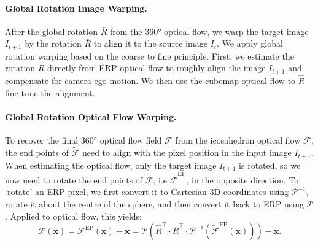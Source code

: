 \vspace{-1em}
\paragraph{Global Rotation Image Warping.}
After  the global rotation $\bar{R}$ from the 360° optical flow, we warp the target image $I_{t+1}$ by the rotation $\bar{R}$ to align it to the source image $I_{t}$. %
%
We apply global rotation warping based on the coarse to fine principle.
First, we estimate the rotation $\bar{R}$ directly from ERP optical flow to roughly align the image $I_{t+1}$ and compensate for camera ego-motion.
We then use the cubemap optical flow to  $\hat{R}$  fine-tune the  alignment.

\vspace{-1em}
\paragraph{Global Rotation Optical Flow Warping.}
To recover the final 360° optical flow field $\mathcal{F}$ from the icosahedron optical flow $\tilde{\mathcal{F}}$, the end points of $\tilde{\mathcal{F}}$ need to align with the pixel position in the input image $I_{t+1}$.
% 
When estimating the optical flow, only the target image $I_{t+1}$ is rotated, so we now need to rotate the end points of $\tilde{\mathcal{F}}$, i.e $\tilde{\mathcal{F}}^\text{EP}$, in the opposite direction.
%
To `rotate' an ERP pixel, we first convert it to Cartesian 3D coordinates using  $\mathcal{P}^{-1}$, rotate it about the centre of the sphere, and then convert it back to ERP  using $\mathcal{P}$.
%
Applied to optical flow, this yields:
%
\begin{equation}\label{equ:approach:globalwarp}
	\mathcal{F}(\mathbf{x})
	= \mathcal{F}^\text{EP}(\mathbf{x}) - \mathbf{x}
	= \mathcal{P} \left( \hat{R}^\top \cdot \bar{R}^\top \cdot \mathcal{P}^{-1}(\tilde{\mathcal{F}}^\text{EP}(\mathbf{x}))\right)  - \mathbf{x}
	\text{.}
\end{equation}
